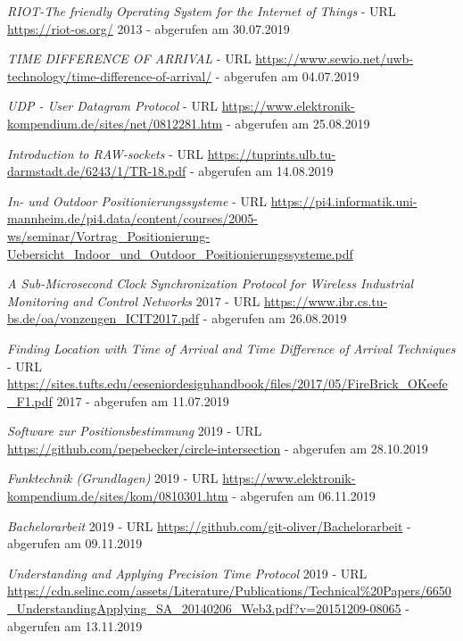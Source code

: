\begin{thebibliography}{}
	\textit{RIOT-The friendly Operating System for the Internet of Things} - URL \url{https://riot-os.org/} 2013 - abgerufen am 30.07.2019	


	\textit{TIME DIFFERENCE OF ARRIVAL} - URL \url{https://www.sewio.net/uwb-technology/time-difference-of-arrival/} - abgerufen am 04.07.2019	


	\textit{UDP - User Datagram Protocol} - URL \url{https://www.elektronik-kompendium.de/sites/net/0812281.htm} - abgerufen am 25.08.2019	

	\textit{Introduction to RAW-sockets} - URL \url{https://tuprints.ulb.tu-darmstadt.de/6243/1/TR-18.pdf} - abgerufen am 14.08.2019	

	\textit{In- und Outdoor
Positionierungssysteme} - URL \url{https://pi4.informatik.uni-mannheim.de/pi4.data/content/courses/2005-ws/seminar/Vortrag_Positionierung-Uebersicht_Indoor_und_Outdoor_Positionierungssysteme.pdf} 

	\textit{A Sub-Microsecond Clock Synchronization Protocol for Wireless Industrial Monitoring and Control Networks} 2017 - URL \url{https://www.ibr.cs.tu-bs.de/oa/vonzengen_ICIT2017.pdf} - abgerufen am 26.08.2019

 
	\textit{Finding Location with Time of Arrival and Time Difference of Arrival Techniques} - URL \url{https://sites.tufts.edu/eeseniordesignhandbook/files/2017/05/FireBrick_OKeefe_F1.pdf} 2017 - abgerufen am 11.07.2019	
	


	\textit{Software zur Positionsbestimmung} 2019 - URL \url{https://github.com/pepebecker/circle-intersection} - abgerufen am 28.10.2019	
	
	
	\textit{Funktechnik (Grundlagen)} 2019 - URL \url{https://www.elektronik-kompendium.de/sites/kom/0810301.htm} - abgerufen am 06.11.2019	
	
\textit{Bachelorarbeit} 2019 - URL \url{https://github.com/git-oliver/Bachelorarbeit} - abgerufen am 09.11.2019	
	
\textit{Understanding and Applying Precision Time Protocol} 2019 - URL \url{https://cdn.selinc.com/assets/Literature/Publications/Technical\%20Papers/6650\_UnderstandingApplying\_SA\_20140206\_Web3.pdf?v=20151209-08065} - abgerufen am 13.11.2019		
	
	
	
	
	
	
\end{thebibliography}
